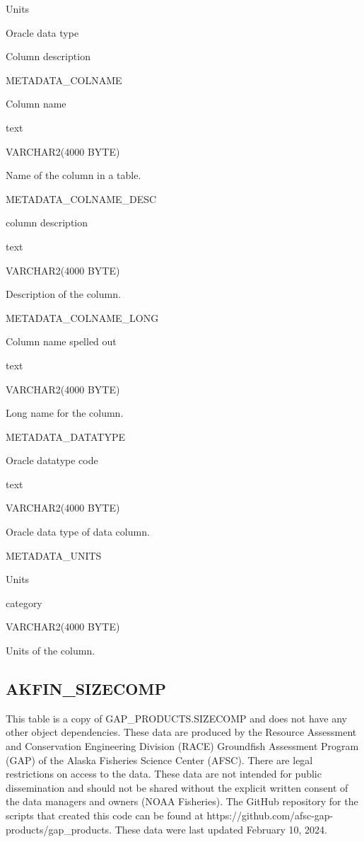 \documentclass[
  letterpaper,
  oneside,
  open=any]{scrbook}
\begin{document}
Units

Oracle data type

Column description

METADATA\_COLNAME

Column name

text

VARCHAR2(4000 BYTE)

Name of the column in a table.

METADATA\_COLNAME\_DESC

column description

text

VARCHAR2(4000 BYTE)

Description of the column.

METADATA\_COLNAME\_LONG

Column name spelled out

text

VARCHAR2(4000 BYTE)

Long name for the column.

METADATA\_DATATYPE

Oracle datatype code

text

VARCHAR2(4000 BYTE)

Oracle data type of data column.

METADATA\_UNITS

Units

category

VARCHAR2(4000 BYTE)

Units of the column.

\hypertarget{akfin_sizecomp}{%
\subsection{AKFIN\_SIZECOMP}\label{akfin_sizecomp}}

This table is a copy of GAP\_PRODUCTS.SIZECOMP and does not have any
other object dependencies. These data are produced by the Resource
Assessment and Conservation Engineering Division (RACE) Groundfish
Assessment Program (GAP) of the Alaska Fisheries Science Center (AFSC).
There are legal restrictions on access to the data. These data are not
intended for public dissemination and should not be shared without the
explicit written consent of the data managers and owners (NOAA
Fisheries). The GitHub repository for the scripts that created this code
can be found at https://github.com/afsc-gap-products/gap\_products.
These data were last updated February 10, 2024.
\end{document}

